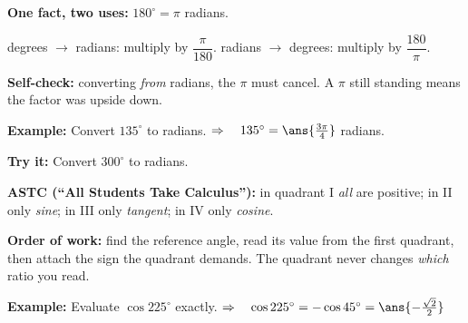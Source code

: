 \documentclass[12pt]{article}
\begin{document}


\begin{formulabox}
\textbf{One fact, two uses:} $180^\circ = \pi$ radians.\par
degrees $\to$ radians: multiply by $\dfrac{\pi}{180}$. \quad radians $\to$ degrees: multiply by $\dfrac{180}{\pi}$.\par
\textbf{Self-check:} converting \emph{from} radians, the $\pi$ must cancel. A $\pi$ still standing means the factor was upside down.
\end{formulabox}

\begin{examplebox}
\textbf{Example:} \quad Convert $135^\circ$ to radians.
$\Rightarrow\quad 135^\circ = \ans{\tfrac{3\pi}{4}}$ radians.
\end{examplebox}

\begin{tryitbox}
\textbf{Try it:} \quad Convert $300^\circ$ to radians.\\[2pt]
\end{tryitbox}


\begin{formulabox}
\textbf{ASTC (``All Students Take Calculus''):} in quadrant I \emph{all} are positive; in II only \emph{sine}; in III only \emph{tangent}; in IV only \emph{cosine}.\par
\textbf{Order of work:} find the reference angle, read its value from the first quadrant, then attach the sign the quadrant demands. The quadrant never changes \emph{which} ratio you read.
\end{formulabox}

\begin{examplebox}
\textbf{Example:} \quad Evaluate $\cos 225^\circ$ exactly.
$\Rightarrow\quad \cos 225^\circ = -\cos 45^\circ = \ans{-\tfrac{\sqrt{2}}{2}}$
\end{examplebox}
\end{document}
